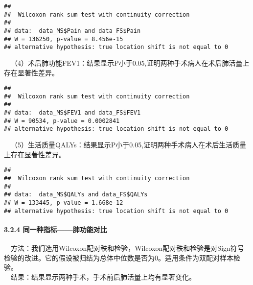 \documentclass[
]{article}
\newenvironment{Shaded}{\begin{snugshade}}{\end{snugshade}}
\newcommand{\FunctionTok}[1]{\textcolor[rgb]{0.00,0.00,0.00}{#1}}
\newcommand{\NormalTok}[1]{#1}
\newcommand{\SpecialCharTok}[1]{\textcolor[rgb]{0.00,0.00,0.00}{#1}}
\begin{document}
\begin{verbatim}
## 
##  Wilcoxon rank sum test with continuity correction
## 
## data:  data_MS$Pain and data_FS$Pain
## W = 136250, p-value = 8.456e-15
## alternative hypothesis: true location shift is not equal to 0
\end{verbatim}

 （4）术后肺功能FEV1：结果显示P小于0.05,证明两种手术病人在术后肺活量上存在显著性差异。

\begin{Shaded}
\end{Shaded}

\begin{verbatim}
## 
##  Wilcoxon rank sum test with continuity correction
## 
## data:  data_MS$FEV1 and data_FS$FEV1
## W = 90534, p-value = 0.0002841
## alternative hypothesis: true location shift is not equal to 0
\end{verbatim}

 （5）生活质量QALYs：结果显示P小于0.05,证明两种手术病人在术后生活质量上存在显著性差异。

\begin{Shaded}
\end{Shaded}

\begin{verbatim}
## 
##  Wilcoxon rank sum test with continuity correction
## 
## data:  data_MS$QALYs and data_FS$QALYs
## W = 133445, p-value = 1.668e-12
## alternative hypothesis: true location shift is not equal to 0
\end{verbatim}

\hypertarget{ux540cux4e00ux79cdux6307ux6807ux80baux529fux80fdux5bf9ux6bd4}{%
\paragraph{3.2.4
同一种指标------肺功能对比}\label{ux540cux4e00ux79cdux6307ux6807ux80baux529fux80fdux5bf9ux6bd4}}

 方法：我们选用Wilcoxon配对秩和检验，Wilcoxon配对秩和检验是对Sign符号检验的改进。它的假设被归结为总体中位数是否为0。适用条件为双配对样本检验。\\
 结果：结果显示两种手术，手术前后肺活量上均有显著变化。
\end{document}
